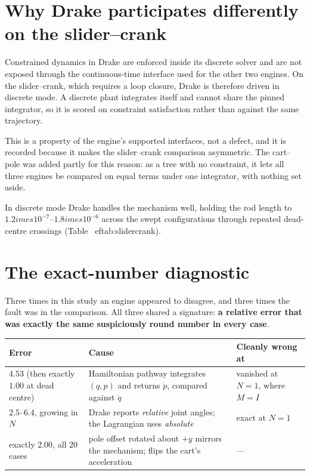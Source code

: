 \documentclass[11pt,a4paper]{article}
\begin{document}
\section{Why Drake participates differently on the slider--crank}

Constrained dynamics in Drake are enforced inside its discrete solver and are
not exposed through the continuous-time interface used for the other two
engines. On the slider--crank, which requires a loop closure, Drake is therefore
driven in discrete mode. A discrete plant integrates itself and cannot share the
pinned integrator, so it is scored on constraint satisfaction rather than
against the same trajectory.

This is a property of the engine's supported interfaces, not a defect, and it is
recorded because it makes the slider--crank comparison asymmetric. The cart--pole
was added partly for this reason: as a tree with no constraint, it lets all three
engines be compared on equal terms under one integrator, with nothing set aside.

In discrete mode Drake handles the mechanism well, holding the rod length to
$1.2	imes10^{-7}$--$1.8	imes10^{-6}$ across the swept configurations through
repeated dead-centre crossings (Table~
ef{tab:slidercrank}).

\section{The exact-number diagnostic}

Three times in this study an engine appeared to disagree, and three times the
fault was in the comparison. All three shared a signature: \textbf{a relative
error that was exactly the same suspiciously round number in every case}.

\begin{center}
\begin{tabular}{@{}lL{0.40\textwidth}l@{}}
\toprule
\textbf{Error} & \textbf{Cause} & \textbf{Cleanly wrong at} \\
\midrule
$4.53$ (then exactly $1.00$ at dead centre) & Hamiltonian pathway integrates $(q,p)$ and returns $\dot p$, compared against $\ddot q$ & vanished at $N{=}1$, where $M=I$ \\
$2.5$--$6.4$, growing in $N$ & Drake reports \emph{relative} joint angles; the Lagrangian uses \emph{absolute} & exact at $N{=}1$ \\
exactly $2.00$, all 20 cases & pole offset rotated about $+y$ mirrors the mechanism; flips the cart's acceleration & --- \\
\bottomrule
\end{tabular}
\end{center}
\end{document}
